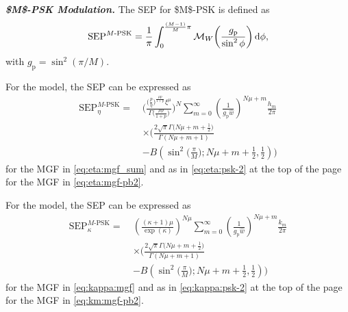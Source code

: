 \documentclass[journal,twocolumn]{IEEEtran}
\begin{document}
\textit{\textbf{\boldmath\ac{$M$-PSK} Modulation.}} The \ac{SEP} for \ac{$M$-PSK} is defined as~\cite[Eq.~(9.15)]{Sim05}
\begin{align}\label{eq:psk}
    \textrm{SEP}^{M\textrm{-PSK}} = \frac{1}{\pi} \int_{0}^{\frac{(M-1)}{M}\pi} \mathcal{M}_{W} \left(\frac{g_{\textrm{p}}}{\sin^2 \phi}\right) \diff\phi, 
\end{align}
with $g_{\textrm{p}} = \sin^{2} \left(\pi/M\right)$.

For the \Ehm{} model, the \ac{SEP} can be expressed as
\begin{align}
    \textrm{SEP}^{M\textrm{-PSK}}_{\eta} = \, & \Bigg( \frac{\big(\frac{p}{\eta }\big)^{\frac{\mu  p}{1+p}}\xi^{\mu}}{\Gamma \big(\frac{\mu  p}{1+p}\big)} \Bigg)^{N  } \sum _{m=0}^{\infty } \left(\frac{1}{g_{\textrm{p}} \hat{w}}\right)^{N \mu + m} \frac{h_m}{2\pi} \nonumber \\
    & \times \Bigg(\frac{2 \sqrt{\pi } \Gamma \big(N \mu + m +\frac{1}{2}\big)}{\Gamma (N \mu + m +1)} \nonumber \\
    & -B\left(\sin ^2\bigg(\frac{\pi }{M}\bigg); N \mu + m +\frac{1}{2},\frac{1}{2}\right)\Bigg) \label{eq:eta:psk-1}
\end{align}
for the \ac{MGF} in \eqref{eq:eta:mgf_sum} and as in \eqref{eq:eta:psk-2} at the top of the page for the \ac{MGF} in \eqref{eq:eta:mgf-pb2}.


For the \km{} model, the \ac{SEP} can be expressed as
\setcounter{equation}{53}
\begin{align}
    \textrm{SEP}^{M\textrm{-PSK}}_{\kappa} = \ & \left(\frac{(\kappa +1) \mu }{\exp(\kappa) }\right)^{N \mu }\sum _{m=0}^{\infty } \left(\frac{1}{g_{\textrm{p}} \hat{w}}\right)^{N \mu + m} \frac{k_m}{2\pi} \nonumber \\
    & \times \Bigg(\frac{2 \sqrt{\pi } \Gamma \big(N \mu + m +\frac{1}{2}\big)}{\Gamma (N \mu + m +1)} \nonumber \\
    & -B\left(\sin ^2\bigg(\frac{\pi }{M}\bigg); N \mu + m +\frac{1}{2},\frac{1}{2}\right)\Bigg) \label{eq:kappa:psk-1}
\end{align}
for the \ac{MGF} in \eqref{eq:kappa:mgf} and as in \eqref{eq:kappa:psk-2} at the top of the page for the \ac{MGF} in \eqref{eq:km:mgf-pb2}.
\end{document}
